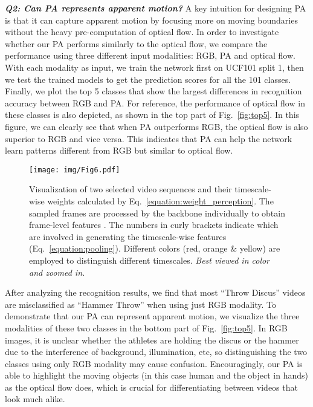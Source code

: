 \documentclass[journal]{IEEEtran}
\begin{document}
\textbf{\emph{Q2: Can PA represents apparent motion? }} A key intuition for designing PA is that it can capture apparent motion by focusing more on moving boundaries without the heavy pre-computation of optical flow. In order to investigate whether our PA performs similarly to the optical flow, we compare the performance using three different input modalities: RGB, PA and optical flow. With each modality as input, we train the network first on UCF101 split 1, then we test the trained models to get the prediction scores for all the 101 classes. Finally, we plot the top 5 classes that show the largest differences in recognition accuracy between RGB and PA. For reference, the performance of optical flow in these classes is also depicted, as shown in the top part of Fig.~\ref{fig:top5}. In this figure, we can clearly see that when PA outperforms RGB, the optical flow is also superior to RGB and vice versa. This indicates that PA can help the network learn patterns different from RGB but similar to optical flow. 

\begin{figure*}[!htbp]
\begin{center}
   \texttt{[image: img/Fig6.pdf]}
\end{center}
   \caption{Visualization of two selected video sequences and their timescale-wise weights  calculated by Eq.~\ref{equation:weight_perception}. The sampled frames are processed by the backbone individually to obtain frame-level features . The numbers in curly brackets indicate which  are involved in generating the timescale-wise features  (Eq.~\ref{equation:pooling}). Different colors (red, orange \& yellow) are employed to distinguish different timescales. \emph{Best viewed in color and zoomed in.}}
\label{fig:VAP_ablation}
\end{figure*}


After analyzing the recognition results, we find that most ``Throw Discus'' videos are misclassified as ``Hammer Throw'' when using just RGB modality. To demonstrate that our PA can represent apparent motion, we visualize the three modalities of these two classes in the bottom part of Fig.~\ref{fig:top5}. In RGB images, it is unclear whether the athletes are holding the discus or the hammer due to the interference of background, illumination, etc, so distinguishing the two classes using only RGB modality may cause confusion. Encouragingly, our PA is able to highlight the moving objects (in this case human and the object in hands) as the optical flow does, which is crucial for differentiating between videos that look much alike. 
\end{document}
